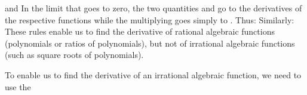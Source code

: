 {{%
%
and
%
%
In the limit that  goes to zero, the two quantities  and  go to the derivatives of the respective functions while the
 multiplying  goes simply to .
Thus:
%
%
Similarly:
%
These rules enable us to find the derivative of rational algebraic functions
(polynomials or ratios of polynomials), but not of irrational algebraic
functions (such as square roots of polynomials).}%
%
\par{To enable us to find the derivative of an irrational algebraic function, we
need to use the 

}}
